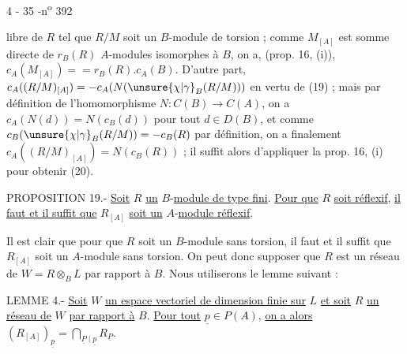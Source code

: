 
\begin{center}4 - 35 -\hfill n\textsuperscript{o} 392\end{center}

libre de $R$ tel que $R/M$ soit un $B$-module de torsion ; comme $M_{[A]}$ est somme directe de $r_B(R)$ $A$-modules isomorphes à $B$, on a, (prop. 16, (i)), $c_A(M_{[A]})= {}=r_B(R).c_A(B)$. D'autre part, $c_A((R/M)_{[A]})=-c_A(N(\unsure{\chi|\gamma}_B(R/M)))$ en vertu de (19) ; mais par définition de l'homomorphisme $N:C(B)\longrightarrow C(A)$, on a $c_A(N(d))=N(c_B(d))$ pour tout $d\in D(B)$, et comme $c_B(\unsure{\chi|\gamma}_B(R/M))=-c_B(R)$ par définition, on a finalement $c_A((R/M)_{[A]})=N(c_B(R))$ ; il suffit alors d'appliquer la prop. 16, (i) pour obtenir (20).

PROPOSITION 19.- \uline{Soit} $R$ \uline{un} $B$-\uline{module de type fini}. \uline{Pour que} $R$ \uline{soit réflexif}, \uline{il faut et il suffit que} $R_{[A]}$ \uline{soit un} $A$-\uline{module réflexif}.

Il est clair que pour que $R$ soit un $B$-module sans torsion, il faut et il suffit que $R_{[A]}$ soit un $A$-module sans torsion. On peut donc supposer que $R$ est un réseau de $W=R\otimes_B L$ par rapport à $B$. Nous utiliserons le lemme suivant :

LEMME 4.- \uline{Soit} $W$ \uline{un espace vectoriel de dimension finie sur} $L$ \uline{et soit} $R$ \uline{un réseau de} $W$ \uline{par rapport à} $B$. \uline{Pour tout} $\underline{p}\in P(A)$, \uline{on a alors} $(R_{[A]})_{\underline{p}}=\bigcap_{\underline{P}\mid\underline{p}}R_{\underline{P}}$.

